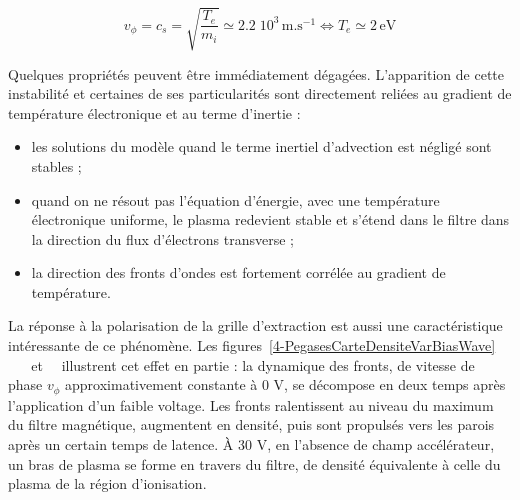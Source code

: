 \begin{refsection}
 \begin{equation}
 	v_\phi=c_{s}=\sqrt{\frac{T_e}{m_i}}\simeq 2.2\;10^{3}\,\text{m.s}^{-1}
 	\Leftrightarrow T_e\simeq 2\,\text{eV}
 \end{equation}
 
 Quelques propriétés peuvent être immédiatement dégagées. L'apparition de cette
 instabilité et certaines de ses particularités sont directement reliées au
 gradient de température électronique et au terme d'inertie :
 
 \begin{itemize}
   	\item les solutions du modèle quand le terme inertiel d'advection est
	négligé sont stables ;
   \item quand on ne résout pas l'équation d'énergie, avec une température
   électronique uniforme, le plasma redevient stable et s'étend dans le filtre
   dans la direction du flux d'électrons transverse ;
   \item la direction des fronts d'ondes est fortement corrélée au gradient
   de température.
\end{itemize}

La réponse à la polarisation de la grille d'extraction est aussi une
caractéristique intéressante de ce phénomène. Les
figures~\ref{4-PegasesCarteDensiteVarBiasWave}~
~ ~
et~~ illustrent cet effet en partie : la
dynamique des fronts, de vitesse de phase $v_\phi$ approximativement constante à
0 V, se décompose en deux temps après l'application d'un faible voltage. Les
fronts ralentissent au niveau du maximum du filtre magnétique, augmentent en densité, puis sont
propulsés vers les parois après un certain temps de latence. À 30 V, en
l'absence de champ accélérateur, un bras de plasma se forme en travers du
filtre, de densité équivalente à celle du plasma de la région d'ionisation.
	

\end{refsection}
